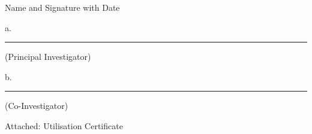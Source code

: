 \documentclass{article}
\begin{document}
\hspace*{\fill} Name and Signature with Date

\vspace{0.2cm}
\hspace*{\fill} a.\rule{4cm}{0.15mm}

\hspace*{\fill} (Principal Investigator)

\vspace{0.3cm}
\hspace*{\fill} b.\rule{4cm}{0.15mm}

\hspace*{\fill} (Co-Investigator)


Attached:  Utilisation Certificate
\end{document}
